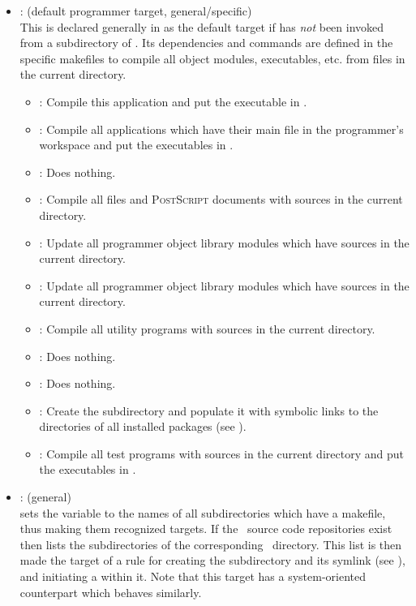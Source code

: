 \begin{itemize}
\item
    : (default programmer target, general/specific)
   \\ This is declared generally in  as the default target if
    has {\em not} been invoked from a subdirectory of
   .  Its dependencies and commands are defined in the
   specific makefiles to compile all object modules, executables, etc. from
   files in the current directory.
   \begin{itemize}
   \item
      : Compile this application and put the executable in
      .
   \item
      : Compile all applications which have their main 
      file in the programmer's workspace and put the executables in
      .
   \item
      : Does nothing.
   \item
      : Compile all  files and \textsc{PostScript}
      documents with sources in the current directory.
   \item
      : Update all programmer object library modules which have
      sources in the current directory.
   \item
      : Update all programmer object library modules which have
      sources in the current directory.
   \item
      : Compile all utility programs with sources in the current
      directory.
   \item
      : Does nothing.
   \item
      : Does nothing.
   \item
      : Create the  subdirectory and populate it with
      symbolic links to the  directories of all installed
      packages (see ).
   \item
      : Compile all test programs with sources in the current
      directory and put the executables in .
   \end{itemize}

\item
    : (general)
   \\  sets the  variable to the names of all
   subdirectories which have a makefile, thus making them recognized targets.
   If the \rcs\ source code repositories exist then  lists
   the subdirectories of the corresponding \rcs\ directory.  This list is then
   made the target of a rule for creating the subdirectory and its 
   symlink (see ), and initiating a  within it.
   Note that this target has a system-oriented counterpart which behaves
   similarly.


\end{itemize}
